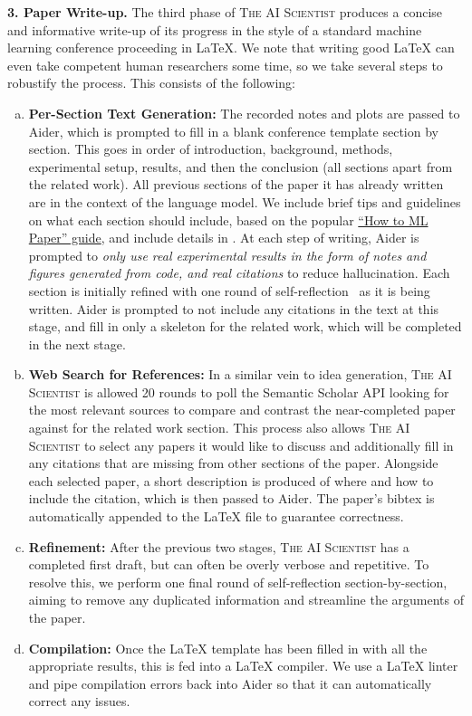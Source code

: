 \documentclass[11pt, a4paper]{include/gdm_format}
\newcommand{\ouralgo}{\textsc{The AI Scientist}\xspace}
\begin{document}
\textbf{3. Paper Write-up.}
The third phase of \ouralgo produces a concise and informative write-up of its progress in the style of a standard machine learning conference proceeding in LaTeX.
We note that writing good LaTeX can even take competent human researchers some time, so we take several steps to robustify the process.
This consists of the following:
\begin{enumerate}[(a)]
\item \textbf{Per-Section Text Generation:} The recorded notes and plots are passed to Aider, which is prompted to fill in a blank conference template section by section.
This goes in order of introduction, background, methods, experimental setup, results, and then the conclusion (all sections apart from the related work).
All previous sections of the paper it has already written are in the context of the language model.
We include brief tips and guidelines on what each section should include, based on the popular \href{https://docs.google.com/document/d/16R1E2ExKUCP5SlXWHr-KzbVDx9DBUclra-EbU8IB-iE/edit#heading=h.16t67gkeu9dx}{``How to ML Paper'' guide}, and include details in .
At each step of writing, Aider is prompted to \emph{only use real experimental results in the form of notes and figures generated from code, and real citations} to reduce hallucination.
Each section is initially refined with one round of self-reflection~\citep{shinn2024reflexion} as it is being written.
Aider is prompted to not include any citations in the text at this stage, and fill in only a skeleton for the related work, which will be completed in the next stage.
\item \textbf{Web Search for References:} In a similar vein to idea generation, \ouralgo is allowed 20 rounds to poll the Semantic Scholar API looking for the most relevant sources to compare and contrast the near-completed paper against for the related work section.
This process also allows \ouralgo to select any papers it would like to discuss and additionally fill in any citations that are missing from other sections of the paper.
Alongside each selected paper, a short description is produced of where and how to include the citation, which is then passed to Aider.
The paper's bibtex is automatically appended to the LaTeX file to guarantee correctness.
\item \textbf{Refinement:} After the previous two stages, \ouralgo has a completed first draft, but can often be overly verbose and repetitive.
To resolve this, we perform one final round of self-reflection section-by-section, aiming to remove any duplicated information and streamline the arguments of the paper.
\item \textbf{Compilation:} Once the LaTeX template has been filled in with all the appropriate results, this is fed into a LaTeX compiler.
We use a LaTeX linter and pipe compilation errors back into Aider so that it can automatically correct any issues.
\end{enumerate}
\end{document}
